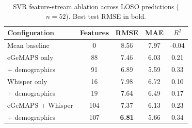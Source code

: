 \begin{table}[H]
\caption{SVR feature-stream ablation across LOSO predictions ($n=52$). Best test RMSE in bold.}
\label{tab:ablation}
\vskip 0.10in
\begin{center}
\begin{small}
\setlength{\tabcolsep}{4pt}
\begin{tabular}{lcccc}
\toprule
Configuration         & Features & RMSE          & MAE  & $R^2$  \\
\midrule
Mean baseline         &   0      & 8.56          & 7.97 & -0.04  \\
\addlinespace
eGeMAPS only          &  88      & 7.46          & 6.03 &  0.21  \\
\quad + demographics  &  91      & 6.89          & 5.59 &  0.33  \\
\addlinespace
Whisper only          &  16      & 7.98          & 6.72 &  0.10  \\
\quad + demographics  &  19      & 7.64          & 6.49 &  0.17  \\
\addlinespace
eGeMAPS + Whisper     & 104      & 7.37          & 6.13 &  0.23  \\
\quad + demographics  & 107      & \textbf{6.81} & 5.66 &  0.34  \\
\bottomrule
\end{tabular}
\end{small}
\end{center}
\vskip -0.15in
\end{table}
